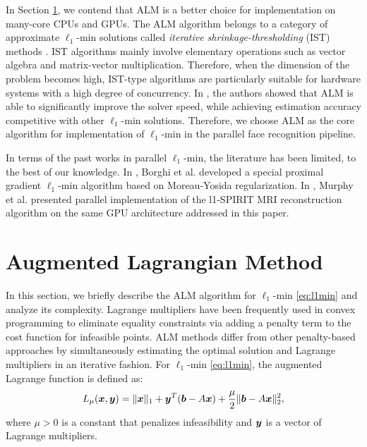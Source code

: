\documentclass[preprint]{sigplanconf}
\begin{document}


In Section \ref{sec:ALM}, we contend that ALM is a better choice for
implementation on many-core CPUs and GPUs. The ALM algorithm belongs to a
category of approximate $\ell_1$-min solutions called \emph{iterative
shrinkage-thresholding} (IST) methods \cite{WrightS2008,BeckA2009}.  IST
algorithms mainly involve elementary operations such as vector algebra and
matrix-vector multiplication. Therefore, when the dimension of the problem
becomes high, IST-type algorithms are particularly suitable for hardware
systems with a high degree of concurrency. In \cite{YangA2010-ICIP}, the
authors showed that ALM is able to significantly improve the solver speed,
while achieving estimation accuracy competitive with other $\ell_1$-min
solutions. Therefore, we choose ALM as the core algorithm for
implementation of $\ell_1$-min in the parallel face recognition pipeline.

In terms of the past works in parallel $\ell_1$-min, the literature has been
limited, to the best of our knowledge. In \cite{BorghiA2010}, Borghi et al.
developed a special proximal gradient $\ell_1$-min algorithm based on
Moreau-Yosida regularization. In \cite{MurphyM2010}, Murphy et al. presented
parallel implementation of the l1-SPIRIT MRI reconstruction algorithm on 
the same GPU architecture addressed in this paper.

\section{Augmented Lagrangian Method}
\label{sec:ALM}
\vspace{-0.06in}
In this section, we briefly describe the ALM algorithm for $\ell_1$-min
\eqref{eq:l1min} \cite{YangA2010-ICIP} and analyze its complexity. Lagrange
multipliers have been frequently used in convex programming to eliminate
equality constraints via adding a penalty term to the cost function for
infeasible points. ALM methods differ from other penalty-based approaches by
simultaneously estimating the optimal solution and Lagrange multipliers in an
iterative fashion.  For $\ell_1$-min \eqref{eq:l1min}, the augmented Lagrange
function is defined as: 
\begin{equation} L_\mu({\boldsymbol{x}},{\boldsymbol{y}}) = \|{\boldsymbol{x}}\|_1 +
{\boldsymbol{y}}^T({\boldsymbol{b}} - A{\boldsymbol{x}}) + \frac{\mu}{2} \| {\boldsymbol{b}}-A{\boldsymbol{x}} \|_2^2, 
\end{equation}
where $\mu > 0$ is a constant that penalizes infeasibility and ${\boldsymbol{y}}$ is a
vector of Lagrange multipliers.
\end{document}
